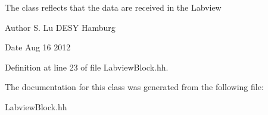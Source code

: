 The class reflects that the data are received in the Labview \begin{DoxyAuthor}{Author}
S. Lu D\-E\-S\-Y Hamburg 
\end{DoxyAuthor}
\begin{DoxyDate}{Date}
Aug 16 2012 
\end{DoxyDate}


Definition at line 23 of file Labview\-Block.\-hh.



The documentation for this class was generated from the following file\-:\begin{DoxyCompactItemize}
\item 
Labview\-Block.\-hh\end{DoxyCompactItemize}

